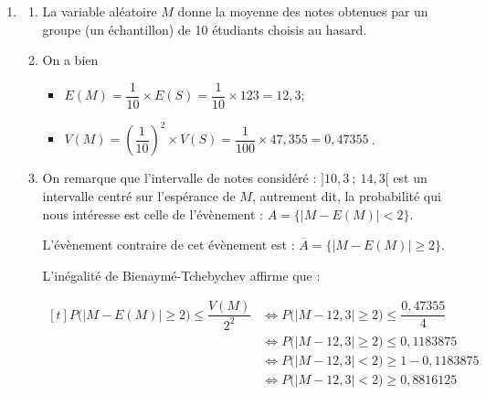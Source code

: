 \documentclass[10pt]{article}
\providecommand{\np}[2][]{{#2~#1}}
\begin{document}
\begin{enumerate}
	\begin{itemize}[label=\textbullet]
		\item pour espérance : \quad $E(N_i) = n \times p = 20 \times 0,615 = 12,3$;
		\item et pour variance : \quad $V(N_i) = n \times p \times (1-p) = 20 \times 0,615 \times 0,385 = 4,7355$.
	\end{itemize}

$S$ étant la somme de ces dix variables aléatoires, on a :

	\begin{itemize}
		\item $E(S) = E(N_1) + E(N_2) + \dots + E(N_{10}) = 12,3 + 12,3 + ... + 12,3 = 123$;
		\item comme les variables aléatoires sont indépendantes,

		$V(S) =  V(N_1) + V(N_2) + \dots + V(N_{10}) = 10 \times 4,7355 = 47,355$	.
\end{itemize}

	\item
	\begin{enumerate}
		\item  La variable aléatoire $M$ donne la moyenne des notes obtenues par un groupe (un échantillon) de 10 étudiants choisis au hasard.

		\item On a bien
		\begin{itemize}
			\item $E(M)= \dfrac{1}{10}\times E(S) = \dfrac{1}{10}\times 123 = 12,3$;
			\item $V(M)=\left(\dfrac{1}{10}\right)^2\times V(S) = \dfrac{1}{100}\times 47,355 =  \np{0,47355}$.
		\end{itemize}
		\item On remarque que l'intervalle de notes considéré : $]10,3 ~;~ 14,3[$ est un intervalle centré sur l'espérance de $M$, autrement dit, la probabilité qui nous intéresse est celle de l'évènement :
		\quad $A = \big\{|M - E(M)| < 2\big\} $.

		L'évènement contraire de cet évènement est : 		\quad $\overline{A} = \big\{|M - E(M)| \geqslant 2\big\} $.

		L'inégalité de Bienaymé-Tchebychev affirme que :

		$\begin{aligned}[t] P\big( |M - E(M)| \geqslant 2 \big) \leqslant \dfrac{V(M)}{2^2 } &\iff P\big( |M -12,3| \geqslant 2 \big) \leqslant \dfrac{0,47355}{4}\\
		&\iff P\big( |M -12,3| \geqslant 2 \big) \leqslant 0,1183875 \\
		&\iff P\big( |M -12,3| <  2 \big) \geqslant 1 - 0,1183875\\
		&\iff P\big( |M -12,3| <  2 \big) \geqslant 0,8816125  \end{aligned}$


\end{enumerate}
\end{enumerate}
\end{document}
